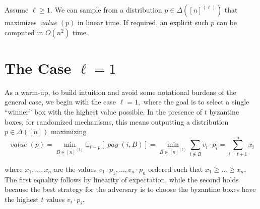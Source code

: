 \documentclass[sigconf,nonacm]{aamas}
\DeclareMathOperator{\payText}{\textit{pay}}
\newcommand{\pay}[1]{\payText({#1})}
\DeclareMathOperator{\valueText}{\textit{value}}
\newcommand{\val}[1]{\valueText({#1})}
\begin{document}
\begin{theorem}\label{th:main} Assume $\ell \geq 1$. We can sample from a distribution $p \in \Delta\left([n]^{(\ell)}\right)$ that maximizes $\val{p}$ in linear time. If required, an explicit such $p$ can be computed in $O(n^2)$ time. 
\end{theorem}

\section{The Case $\ell = 1$}\label{sect:ell-1}

As a warm-up, to build intuition and avoid some notational burdens of the general case, we begin with the case $\ell = 1,$ where the goal is to select a single ``winner'' box with the highest value possible. In the presence of $t$ byzantine boxes, for randomized mechanisms, this means outputting a distribution $p \in \Delta([n])$ maximizing
%
\begin{equation}\label{eq:objective:ell1}
    \val{p} = \min_{B \in [n]^{(t)}}\mathbb{E}_{i \sim p}[\pay{i, B}] = \min_{B \in [n]^{(t)}} \sum_{i \notin B} v_i \cdot p_i = \sum_{i = t + 1}^{n} x_i 
\end{equation}

\noindent where $x_1, \dots, x_n$ are the values $v_1 \cdot p_1, \dots, v_n \cdot p_n$ ordered such that $x_1 \geq \dots \geq x_n$. The first equality follows by linearity of expectation, while the second holds because the best strategy for the adversary is to choose the byzantine boxes have the highest $t$ values $v_i \cdot p_i.$
\end{document}
